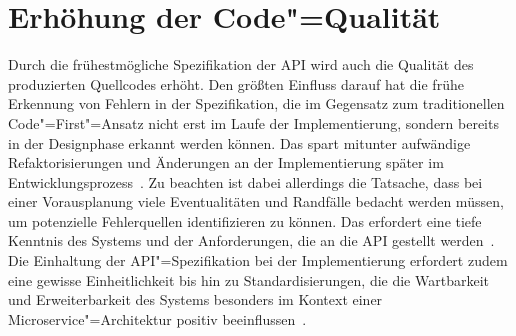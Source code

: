 \section{Erhöhung der Code"=Qualität}
Durch die frühestmögliche Spezifikation der \ac{API} wird auch die Qualität des produzierten Quellcodes erhöht.
Den größten Einfluss darauf hat die frühe Erkennung von Fehlern in der Spezifikation, die im Gegensatz zum traditionellen Code"=First"=Ansatz nicht erst im Laufe der Implementierung, sondern bereits in der Designphase erkannt werden können.
Das spart mitunter aufwändige Refaktorisierungen und Änderungen an der Implementierung später im Entwicklungsprozess~\cite{vol22}.
Zu beachten ist dabei allerdings die Tatsache, dass bei einer Vorausplanung viele Eventualitäten und Randfälle bedacht werden müssen, um potenzielle Fehlerquellen identifizieren zu können. Das erfordert eine tiefe Kenntnis des Systems und der Anforderungen, die an die \ac{API} gestellt werden~\cite[362]{de23}. %
Die Einhaltung der \ac{API}"=Spezifikation bei der Implementierung erfordert zudem eine gewisse Einheitlichkeit bis hin zu Standardisierungen, die die Wartbarkeit und Erweiterbarkeit des Systems besonders im Kontext einer Microservice"=Architektur positiv beeinflussen~\cite[1628]{cha21}.